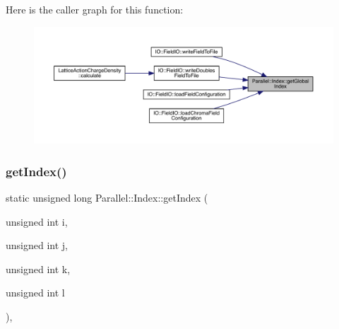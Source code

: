 Here is the caller graph for this function\+:\nopagebreak
\begin{figure}[H]
\begin{center}
\leavevmode
\includegraphics[width=350pt]{class_parallel_1_1_index_aaa2650024b4e91dc86d2bdc568c8f57d_icgraph}
\end{center}
\end{figure}
\mbox{\label{class_parallel_1_1_index_af31faeef1369fdc0997d1910e008bfe2}} 
\subsubsection{\texorpdfstring{getIndex()}{getIndex()}}
{\footnotesize\ttfamily static unsigned long Parallel\+::\+Index\+::get\+Index (\begin{DoxyParamCaption}\item[{unsigned int}]{i,  }\item[{unsigned int}]{j,  }\item[{unsigned int}]{k,  }\item[{unsigned int}]{l }\end{DoxyParamCaption})\hspace{0.3cm}{\ttfamily [inline]}, {\ttfamily [static]}}

